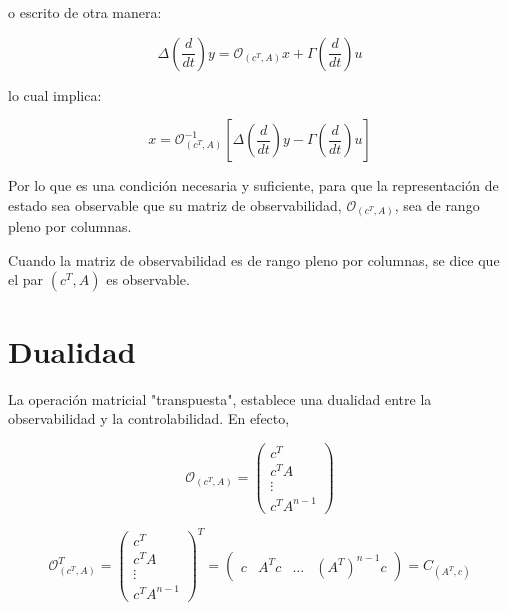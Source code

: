 		o escrito de otra manera:

		\begin{equation*}
			\Delta \left( \frac{d}{dt} \right) y = \mathcal{O}_{(c^T, A)} x + \Gamma \left( \frac{d}{dt} \right) u
		\end{equation*}

		lo cual implica:

		\begin{equation}
			x = \mathcal{O}_{(c^T, A)}^{-1} \left[ \Delta \left( \frac{d}{dt} \right) y - \Gamma \left( \frac{d}{dt} \right) u \right]
		\end{equation}

		Por lo que es una condición necesaria y suficiente, para que la representación de estado sea observable que su matriz de observabilidad, $\mathcal{O}_{(c^T, A)}$, sea de rango pleno por columnas.

		Cuando la matriz de observabilidad es de rango pleno por columnas, se dice que el par $(c^T, A)$ es observable.


    \newpage
    \section{Dualidad}

		La operación matricial "transpuesta", establece una dualidad entre la observabilidad y la controlabilidad. En efecto,

		\begin{equation}
			\mathcal{O}_{(c^T, A)} =
			 \begin{pmatrix}
			 	c^T \\
				c^T A \\
				\vdots \\
				c^T A^{n-1}
			 \end{pmatrix}
		\end{equation}

		\begin{equation}
			\mathcal{O}_{(c^T, A)}^T =
			\begin{pmatrix}
				c^T \\
				c^T A \\
				\vdots \\
				c^T A^{n-1}
			\end{pmatrix}^T =
			\begin{pmatrix}
				c & A^T c & \dots & \left( A^T \right)^{n-1} c
			\end{pmatrix} = C_{(A^T, c)}
		\end{equation}

